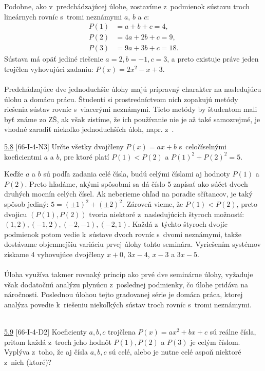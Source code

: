 \rie Podobne, ako v~predchádzajúcej úlohe, zostavíme z~podmienok sústavu troch lineárnych rovníc s~tromi neznámymi $a$, $b$ a $c$:
\begin{align*}
P(1) &= a + b + c = 4, \\
P(2) &= 4a + 2b + c = 9, \\
P(3) &= 9a + 3b + c = 18.
\end{align*}
Sústava má opäť jediné riešenie $a = 2, b = -1, c = 3$, a preto existuje práve jeden trojčlen vyhovujúci zadaniu: $P(x)=2x^2-x+3$.\\
\\
\kom Predchádzajúce dve jednoduchšie úlohy majú prípravný charakter na nasledujúcu úlo\-hu a domácu prácu. Študenti si prostredníctvom nich zopakujú metódy riešenia sústav rovníc s~viacerými neznámymi. Tieto metódy by študentom mali byť známe zo ZŠ, ak však zistíme, že ich používanie nie je až také samozrejmé, je vhodné zaradiť niekoľko jednoduchších úloh, napr. z~\cite{kubat2000}.\\

\begin{tcolorbox}[breakable,notitle,boxrule=0pt,colback=light-gray,colframe=light-gray]\ul{5.8} [66-I-4-N3] Určte všetky dvojčleny $P (x) = ax+b$ s~celočíselnými koeficientmi $a$ a $b$, pre ktoré platí $P (1) < P (2)$ a $P (1)^2+ P(2)^2= 5$.

\end{tcolorbox}

\rieh Keďže $a$ a $b$ sú podľa zadania celé čísla, budú celými číslami aj hodnoty $P(1)$ a $P(2)$. Preto hľadáme, akými spôsobmi sa dá číslo 5 zapísať ako súčet dvoch druhých mocnín celých čísel. Ak neberieme ohľad na poradie sčítancov, je taký spôsob jediný: $5 = (\pm 1)^2+ (\pm 2)^2$. Zároveň vieme, že $P(1)<P(2)$, preto dvojicu $(P(1), P(2))$ tvoria niektoré z~nasledujúcich štyroch možností: $(1, 2), (-1, 2), (-2, -1), (-2, 1)$. Každá z~týchto štyroch dvojíc podmienok potom vedie k~sústave dvoch rovníc s~dvomi neznámymi, takže dostávame objemnejšiu variáciu prvej úlohy tohto seminára. Vyriešením systémov získame 4 vyhovujúce dvojčleny $x + 0$, $3x - 4$, $x - 3$ a $3x - 5$.\\
\\
\kom Úloha využíva takmer rovnaký princíp ako prvé dve seminárne úlohy, vyžaduje však dodatočnú analýzu plynúcu z~poslednej podmienky, čo úlohe pridáva na náročnosti. Poslednou úlohou tejto gradovanej série je domáca práca, ktorej analýza povedie k~riešeniu niekoľkých sústav troch rovníc s~tromi neznámymi.\\
\\
\begin{tcolorbox}[breakable,notitle,boxrule=0pt,colback=light-gray,colframe=light-gray]\ul{5.9} [66-I-4-D2] Koeficienty $a, b, c$ trojčlena $P (x) = ax^2+ bx + c$ sú reálne čísla, pritom každá z~troch jeho hodnôt $P (1), P (2)$ a $P (3)$ je celým číslom. Vyplýva z~toho, že aj čísla $a, b, c$ sú celé, alebo je nutne celé aspoň niektoré z~nich (ktoré)?

\end{tcolorbox}

